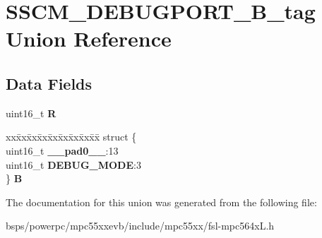 \hypertarget{unionSSCM__DEBUGPORT__16B__tag}{}\section{S\+S\+C\+M\+\_\+\+D\+E\+B\+U\+G\+P\+O\+R\+T\+\_\+B\+\_\+tag Union Reference}
\label{unionSSCM__DEBUGPORT__16B__tag}
\subsection*{Data Fields}
\begin{DoxyCompactItemize}
\item 
\mbox{\label{unionSSCM__DEBUGPORT__16B__tag_a6bca403b155727a7cd69b1faf8df9c28}} 
uint16\+\_\+t {\bfseries R}
\item 
\mbox{\label{unionSSCM__DEBUGPORT__16B__tag_a81cea4674a0146b345ba4b67bca7212b}} 
\begin{tabbing}
xx\=xx\=xx\=xx\=xx\=xx\=xx\=xx\=xx\=\kill
struct \{\\
\>uint16\_t {\bfseries \_\_pad0\_\_}:13\\
\>uint16\_t {\bfseries DEBUG\_MODE}:3\\
\} {\bfseries B}\\

\end{tabbing}\end{DoxyCompactItemize}


The documentation for this union was generated from the following file\+:\begin{DoxyCompactItemize}
\item 
bsps/powerpc/mpc55xxevb/include/mpc55xx/fsl-\/mpc564x\+L.\+h\end{DoxyCompactItemize}

